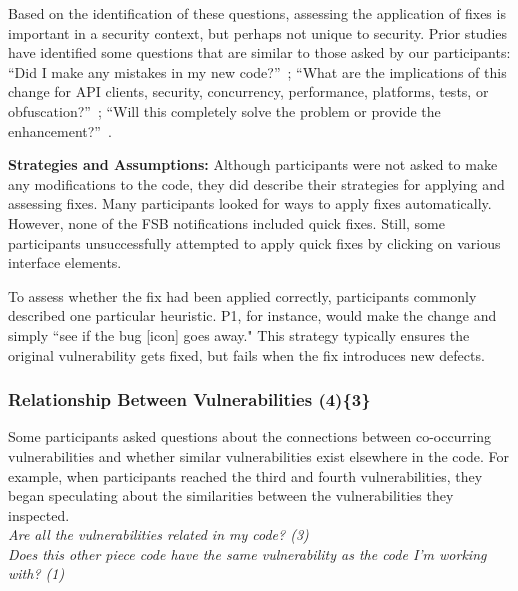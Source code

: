 \documentclass[10pt,journal,compsoc]{IEEEtran}
\begin{document}
Based on the identification of these questions, assessing the application of fixes is important in a security context, but perhaps not unique to security.
Prior studies have identified some questions that are similar to those asked by our participants:
``Did I make any mistakes in my new code?''~\cite{Ko:2007:information};
``What are the implications of this change for API clients, security, concurrency, performance, platforms, tests, or obfuscation?''~\cite{latoza2010hard};
``Will this completely solve the problem or provide the enhancement?''~\cite{sillito2008asking}.


\textbf{Strategies and Assumptions:}
Although participants were not asked to make any modifications to the code, they did describe their strategies for applying and assessing fixes.
Many participants looked for ways to apply fixes automatically.
However, none of the FSB notifications included quick fixes.
Still, some participants unsuccessfully attempted to apply quick fixes by clicking on various interface elements.

To assess whether the fix had been applied correctly, participants commonly described one particular heuristic. P1, for instance, would make the change and simply ``see if the bug [icon] goes away." 
This strategy typically ensures the original vulnerability gets fixed, but fails when the fix introduces new defects.



\subsubsection{Relationship Between Vulnerabilities (4)\{3\}}\label{rbb}

Some participants asked questions about the connections between co-occurring vulnerabilities and whether similar vulnerabilities exist elsewhere in the code. 
For example, when participants reached the third and fourth vulnerabilities, they began speculating about the similarities between the vulnerabilities they inspected.
\\

\noindent\emph{Are all the vulnerabilities related in my code? (3)} \\
\emph{Does this other piece code have the same vulnerability as the code I'm working with? (1)} 
\\
\end{document}
